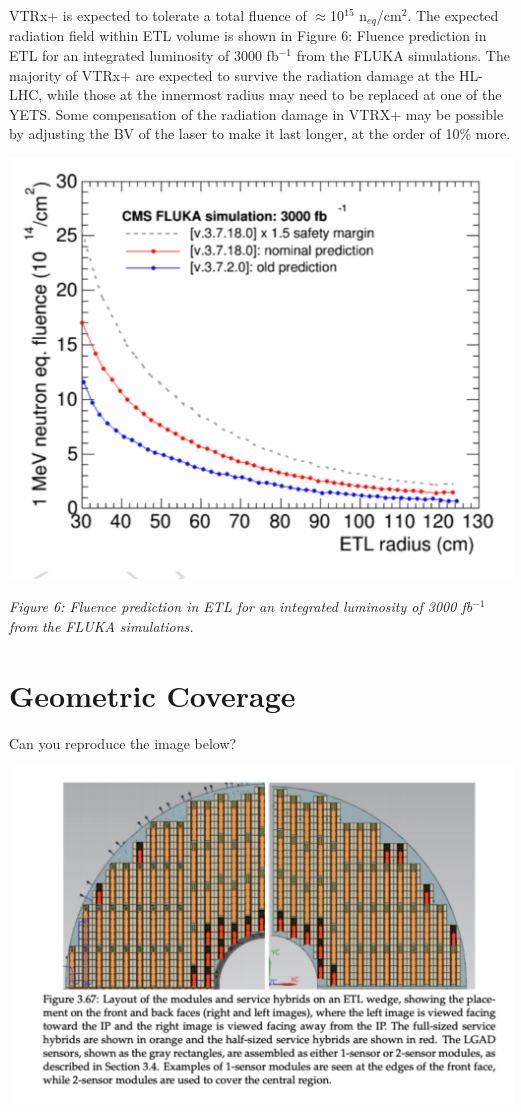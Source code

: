 \documentclass[11pt]{article}
\begin{document}
VTRx+ is expected to tolerate a total fluence of $\approx$10$^{15}$ n$_{eq}$/cm$^{2}$. The expected radiation field within ETL volume is shown in Figure 6: Fluence prediction in ETL for an integrated luminosity of 3000 fb$^{-1}$ from the FLUKA simulations. The majority of VTRx+ are expected to survive the radiation damage at the HL-LHC, while those at the innermost radius may need to be replaced at one of the YETS. Some compensation of the radiation damage in VTRX+ may be possible by adjusting the BV of the laser to make it last longer, at the order of 10\% more.

\includegraphics[width=\linewidth]{figures/image6.pdf}

\emph{Figure 6: Fluence prediction in ETL for an integrated luminosity of 3000 fb$^{-1}$ from the FLUKA simulations.}

\section{Geometric Coverage}

Can you reproduce the image below?

\includegraphics[width=\linewidth]{figures/image5.pdf}
\end{document}
